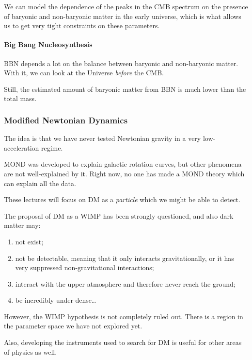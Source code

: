 \documentclass[main.tex]{subfiles}
\begin{document}
We can model the dependence of the peaks in the CMB spectrum on the presence of
baryonic and non-baryonic matter in the early universe, which is what allows us to get 
very tight constraints on these parameters.

\paragraph{Big Bang Nucleosynthesis}

BBN depends a lot on the balance between baryonic and non-baryonic matter.
With it, we can look at the Universe \emph{before} the CMB. 


Still, the estimated amount of baryonic matter from BBN is much lower 
than the total mass. 

\subsubsection{Modified Newtonian Dynamics}

The idea is that we have never tested Newtonian gravity in a very low-acceleration 
regime. 

MOND was developed to explain galactic rotation curves, but other 
phenomena are not well-explained by it. 
Right now, no one has made a MOND theory which can explain all the data. 

These lectures will focus on DM as a \emph{particle} which we might be able 
to detect. 

The proposal of DM as a WIMP has been strongly questioned, and also dark matter may:
\begin{enumerate}
    \item not exist;
    \item not be detectable, meaning that it only interacts gravitationally, or it has very suppressed non-gravitational interactions;
    \item interact with the upper atmosphere and therefore never reach the ground;
    \item be incredibly under-dense\dots
\end{enumerate}

However, the WIMP hypothesis is not completely ruled out.
There is a region in the parameter space we have not explored yet. 

Also, developing the instruments used to search for DM is useful for other areas of 
physics as well. 
\end{document}
